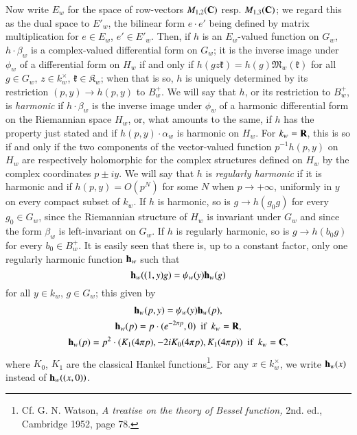 Now write $E_{w}$ for the space of row-vectors $M_{1,2}(\mathbf{C})$ resp. $M_{1,3}(\mathbf{C})$; we regard this as the dual space to $E'_{w}$, the bilinear form $e\cdot e'$ being defined by matrix multiplication for $e\in E_{w}$, $e'\in E'_{w}$. Then, if $h$ is an $E_{w}$-valued function on $G_{w}$, $h\cdot \beta_{w}$ is a complex-valued differential form on $G_{w}$; it is the inverse image under $\phi_{w}$ of a differential form on $H_{w}$ if and only if $h(gz\mathfrak{k})=h(g)\mathfrak{M}_{w}(\mathfrak{k})$ for all $g\in G_{w}$, $z\in k^{\times}_{w}$, $\mathfrak{k}\in \mathfrak{K}_{w}$; when that is so, $h$ is uniquely determined by its restriction $(p,y)\to h(p,y)$ to $B^{+}_{w}$. We will say that $h$, or its restriction to $B^{+}_{w}$, is {\em harmonic} if $h\cdot \beta_{w}$ is the inverse image under $\phi_{w}$ of a harmonic differential form on the Riemannian space $H_{w}$, or, what amounts to the same, if $h$ has the property just stated and if $h(p,y)\cdot \alpha_{w}$ is harmonic on $H_{w}$. For $k_{w}=\mathbf{R}$, this is so if and only if the two components of the vector-valued function $p^{-1}h(p,y)$ on $H_{w}$ are respectively holomorphic for the complex structures defined on $H_{w}$ by the complex coordinates $p\pm iy$. We will say that $h$ is {\em regularly harmonic} if it is harmonic and if $h(p,y)=O(p^{N})$ for some $N$ when $p\to +\infty$, uniformly in $y$ on every compact subset of $k_{w}$. If $h$ is harmonic, so is $g\to h(g_{0}g)$ for every $g_{0}\in G_{w}$, since the Riemannian structure of $H_{w}$ is invariant under $G_{w}$ and since the form $\beta_{w}$ is left-invariant on $G_{w}$. If $h$ is regularly harmonic, so is $g\to h(b_{0}g)$ for every $b_{0}\in B^{+}_{w}$. It is easily seen that there is, up to a constant factor, only one regularly harmonic function $\mathbf{h}_{w}$ such that
$$
\mathbf{h}_{w}((1,y)g)=\psi_{w}(y)\mathbf{h}_{w}(g)
$$\pageoriginale
for all $y\in k_{w}$, $g\in G_{w}$; this given by
\begin{gather*}
\mathbf{h}_{w}(p,y)=\psi_{w}(y)\mathbf{h}_{w}(p),\\
\mathbf{h}_{w}(p)=p\cdot (e^{-2\pi p},0) \text{~ if~ } k_{w}=\mathbf{R},\\
\mathbf{h}_{w}(p)=p^{2}\cdot (K_{1}(4\pi p),-2i K_{0}(4\pi p), K_{1}(4\pi p))\text{~ if~ } k_{w}=\mathbf{C},
\end{gather*}
where $K_{0}$, $K_{1}$ are the classical Hankel functions\footnote[1]{Cf. G. N. Watson,  {\em A treatise on the theory of Bessel function,} 2nd. ed., Cambridge 1952, page 78.}. For any $x\in k^{\times}_{w}$, we write $\mathbf{h}_{w}(x)$ instead of $\mathbf{h}_{w}((x,0))$.

